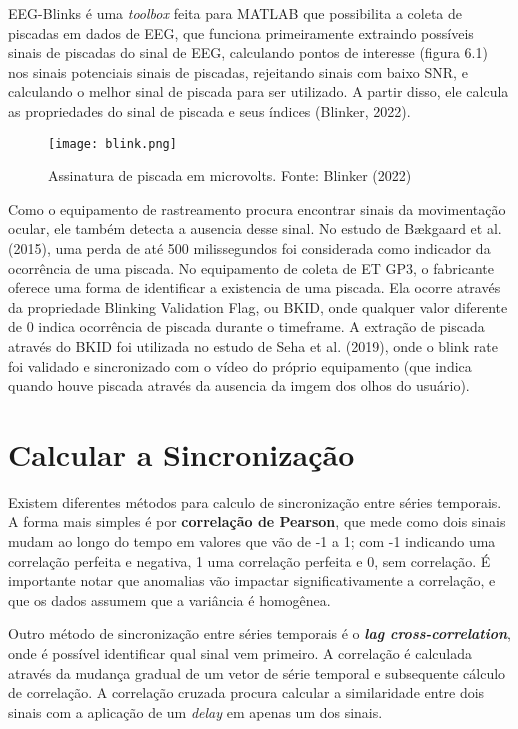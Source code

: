 EEG-Blinks é uma \textit{toolbox} feita para MATLAB que possibilita a coleta de piscadas em dados de EEG, que 
funciona primeiramente extraindo possíveis sinais de piscadas do sinal de EEG, calculando pontos de interesse (figura 6.1) 
nos sinais potenciais sinais de piscadas, rejeitando sinais com baixo SNR, e calculando o melhor sinal de piscada
para ser utilizado. A partir disso, ele calcula as propriedades do sinal de piscada e seus índices (Blinker, 2022).

\begin{figure}[!h]
    \centering
    \texttt{[image: blink.png]}
    \caption{Assinatura de piscada em microvolts. Fonte: Blinker (2022)}
\end{figure}
 


Como o equipamento de rastreamento procura encontrar sinais da movimentação ocular, ele também detecta a ausencia desse sinal. No estudo 
de Bækgaard et al. (2015), uma perda de até 500 milissegundos foi considerada como indicador da ocorrência de uma piscada. No equipamento de coleta de ET GP3, 
o fabricante oferece uma forma de identificar a existencia de uma piscada. Ela ocorre através da propriedade Blinking Validation Flag, ou BKID, onde qualquer 
valor diferente de 0 indica ocorrência de piscada durante o timeframe. A extração de piscada através do BKID foi utilizada no estudo de Seha et al. (2019), 
onde o blink rate foi validado e sincronizado com o vídeo do próprio equipamento (que indica quando houve piscada através da ausencia da imgem dos olhos do usuário).



\section{Calcular a Sincronização}
Existem diferentes métodos para calculo de sincronização entre séries temporais. 
A forma mais simples é por \textbf{correlação de Pearson}, que mede como dois sinais mudam ao longo do tempo em valores que vão de -1 a 1;
com -1 indicando uma correlação perfeita e negativa, 1 uma correlação perfeita e 0, sem correlação. 
É importante notar que anomalias vão impactar significativamente a correlação, e que os dados assumem que a variância é homogênea. 

Outro método de sincronização entre séries temporais é o \textit{\textbf{lag cross-correlation}}, onde é possível identificar
qual sinal vem primeiro. A correlação é calculada através da mudança gradual de um vetor de série temporal e subsequente cálculo 
de correlação. A correlação cruzada procura calcular a similaridade entre dois sinais com a aplicação de um \textit{delay} em apenas um dos sinais.

